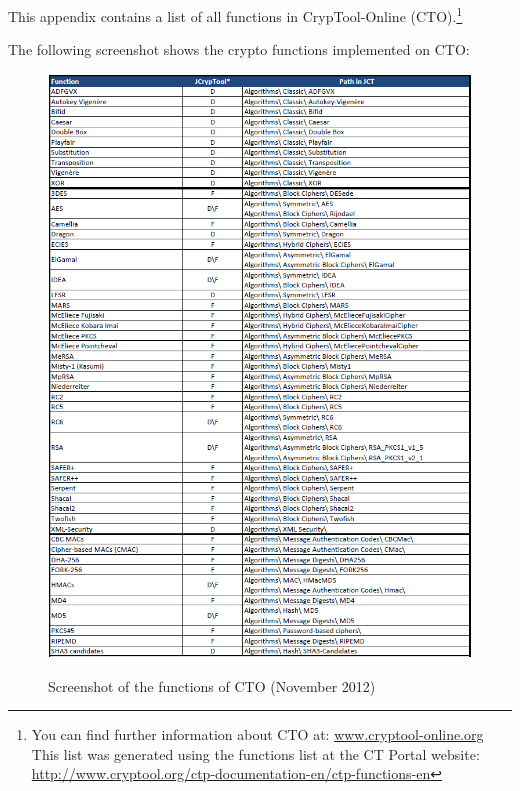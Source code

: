 \noindent This appendix contains a list of all
functions in CrypTool-Online (CTO).\footnote{%
  You can find further information about CTO at:
  \url{www.cryptool-online.org} \\
  This list was generated using the functions list at the CT Portal website:\\
  \url{http://www.cryptool.org/ctp-documentation-en/ctp-functions-en}}




\noindent The following screenshot shows the crypto functions implemented on CTO:
\clearpage
\begin{figure}[hb]
\begin{center}
\vspace{-30pt}
\includegraphics[scale=0.8, angle=0] {figures/JCT-functions-en-1}
\hypertarget{functions-overview-1-CTO}{}
\caption{Screenshot of the functions of CTO (November 2012)} 
\label{functions-overview-1-CTO}
\end{center}
\end{figure}
\clearpage

